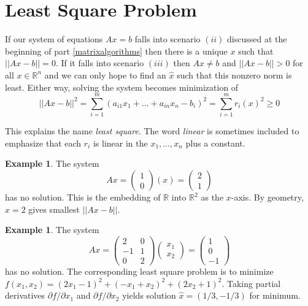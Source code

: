 \documentclass[12pt]{amsart}
\theoremstyle{definition}
\newtheorem{example}[theorem]{Example}
\begin{document}
\section{Least Square Problem} If our system of equations $Ax = b$ falls into scenario $(ii)$ discussed at the beginning of part \ref{matrixalgorithms} then there is a unique $x$ such that $||Ax - b|| = 0$. If it falls into scenario $(iii)$ then $Ax \neq b$ and $||Ax - b|| > 0$ for all $x \in \mathbb{R}^n$ and we can only hope to find an $\hat{x}$ such that this nonzero norm is least. Either way, solving the system becomes minimization of
$$||Ax - b||^2 = \sum\limits_{i =1}^m (a_{i1}x_1 + \ldots + a_{in}x_n - b_i)^2 = \sum\limits_{i = 1}^m r_i(x)^2 \geq 0$$

This explains the name \textit{least square}. The word \textit{linear} is sometimes included to emphasize that each $r_i$ is linear in the $x_1, \dots, x_n$ plus a constant.

\begin{example}\label{} The system
$$ Ax = \left(\begin{array}{c} 1 \\ 0 \end{array}\right)(x) = \left(\begin{array}{c} 2 \\1 \end{array}\right)$$
has no solution. This is the embedding of $\mathbb{R}$ into $\mathbb{R}^2$ as the $x$-axis. By geometry, $\hat{x} = 2$ gives smallest $||Ax - b||$.
\end{example}

\begin{example}\label{} The system
$$Ax = \left(\begin{array}{cc} 2 & 0 \\ -1 & 1 \\ 0 & 2 \end{array} \right) \left(\begin{array}{c} x_1 \\ x_2 \end{array}\right) = \left(\begin{array}{c} 1 \\ 0 \\ -1 \end{array}\right)$$
has no solution. The corresponding least square problem is to minimize $f(x_1, x_2) = (2x_1 - 1)^2 + (-x_1 + x_2)^2 + (2x_2 + 1)^2$. Taking partial derivatives $\partial f / \partial x_1$ and $\partial f / \partial x_2$ yields solution $\hat{x} = (1/3, - 1/3)$ for minimum.
\end{example}
\end{document}
